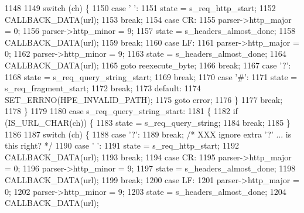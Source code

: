 \begin{DoxyCode}
1148 
1149         \textcolor{keywordflow}{switch} (ch) \{
1150           \textcolor{keywordflow}{case} \textcolor{charliteral}{' '}:
1151             state = s_req_http_start;
1152             CALLBACK_DATA(url);
1153             \textcolor{keywordflow}{break};
1154           \textcolor{keywordflow}{case} CR:
1155             parser->http_major = 0;
1156             parser->http_minor = 9;
1157             state = s_headers_almost_done;
1158             CALLBACK_DATA(url);
1159             \textcolor{keywordflow}{break};
1160           \textcolor{keywordflow}{case} LF:
1161             parser->http_major = 0;
1162             parser->http_minor = 9;
1163             state = s_headers_almost_done;
1164             CALLBACK_DATA(url);
1165             \textcolor{keywordflow}{goto} reexecute\_byte;
1166             \textcolor{keywordflow}{break};
1167           \textcolor{keywordflow}{case} \textcolor{charliteral}{'?'}:
1168             state = s_req_query_string_start;
1169             \textcolor{keywordflow}{break};
1170           \textcolor{keywordflow}{case} \textcolor{charliteral}{'#'}:
1171             state = s_req_fragment_start;
1172             \textcolor{keywordflow}{break};
1173           \textcolor{keywordflow}{default}:
1174             SET_ERRNO(HPE_INVALID_PATH);
1175             \textcolor{keywordflow}{goto} error;
1176         \}
1177         \textcolor{keywordflow}{break};
1178       \}
1179 
1180       \textcolor{keywordflow}{case} s_req_query_string_start:
1181       \{
1182         \textcolor{keywordflow}{if} (IS_URL_CHAR(ch)) \{
1183           state = s_req_query_string;
1184           \textcolor{keywordflow}{break};
1185         \}
1186 
1187         \textcolor{keywordflow}{switch} (ch) \{
1188           \textcolor{keywordflow}{case} \textcolor{charliteral}{'?'}:
1189             \textcolor{keywordflow}{break}; \textcolor{comment}{/* XXX ignore extra '?' ... is this right? */}
1190           \textcolor{keywordflow}{case} \textcolor{charliteral}{' '}:
1191             state = s_req_http_start;
1192             CALLBACK_DATA(url);
1193             \textcolor{keywordflow}{break};
1194           \textcolor{keywordflow}{case} CR:
1195             parser->http_major = 0;
1196             parser->http_minor = 9;
1197             state = s_headers_almost_done;
1198             CALLBACK_DATA(url);
1199             \textcolor{keywordflow}{break};
1200           \textcolor{keywordflow}{case} LF:
1201             parser->http_major = 0;
1202             parser->http_minor = 9;
1203             state = s_headers_almost_done;
1204             CALLBACK_DATA(url);

\end{DoxyCode}
